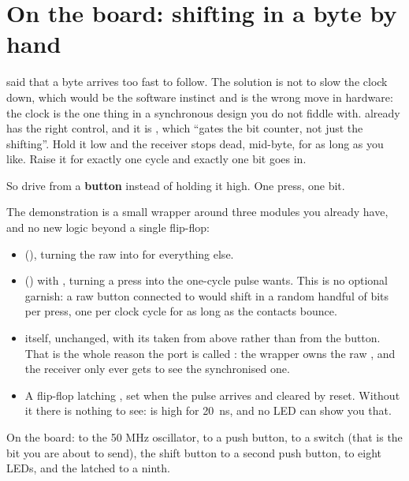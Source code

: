 \section{On the board: shifting in a byte by hand}
\label{c6:sec:shiftdemo}

 said that a byte arrives too fast to follow. The solution is not to slow the
clock down, which would be the software instinct and is the wrong move in hardware: the clock is the
one thing in a synchronous design you do not fiddle with.  already has the right
control, and it is , which ``gates the bit counter, not just the shifting''. Hold
it low and the receiver stops dead, mid-byte, for as long as you like. Raise it for exactly one
cycle and exactly one bit goes in.

So drive  from a \textbf{button} instead of holding it high. One press, one bit.

The demonstration is a small wrapper around three modules you already have, and no new logic beyond
a single flip-flop:
\begin{itemize}
  \item {} (), turning the raw  into
     for everything else.
  \item {} () with , turning a press into
    the one-cycle pulse  wants. This is no optional garnish: a raw button
    connected to  would shift in a random handful of bits per press, one per
    clock cycle for as long as the contacts bounce.
  \item {} itself, unchanged, with its  taken from
     above rather than from the button. That is the whole reason the port is called
    : the wrapper owns the raw , and the receiver only ever gets to
    see the synchronised one.
  \item A flip-flop latching , set when the pulse arrives and cleared by reset.
    Without it there is nothing to see:  is high for 20~ns, and no LED can show you
    that.
\end{itemize}

On the board:  to the 50 MHz oscillator,  to a push button,
 to a switch (that is the bit you are about to send), the shift button to a second
push button,  to eight LEDs, and the latched  to a
ninth.

